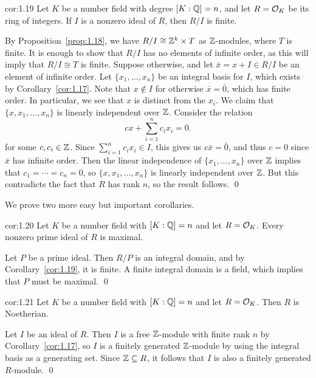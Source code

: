 \begin{cor}{cor:1.19}
    Let $K$ be a number field with degree $[K : \mathbb{Q}] = n$, and let 
    $R = {\cal O}_K$ be its ring of integers. 
    If $I$ is a nonzero ideal of $R$, then $R/I$ is finite. 
\end{cor}\vspace{-0.15cm}
\begin{pf}
    By Proposition~\ref{prop:1.18}, we have $R/I \cong \mathbb{Z}^k \times T$ 
    as $\mathbb{Z}$-modules, where $T$ is finite. It is enough to show that 
    $R/I$ has no elements of infinite order, as this will imply that 
    $R/I \cong T$ is finite. Suppose otherwise, and let $\bar{x} = 
    x + I \in R/I$ be an element of infinite order. Let $\{x_1, \dots, x_n\}$
    be an integral basis for $I$, which exists by Corollary~\ref{cor:1.17}. 
    Note that $x \notin I$ for otherwise $\bar{x} = \bar{0}$, which has 
    finite order. In particular, we see that $x$ is distinct from 
    the $x_i$. We claim that $\{x, x_1, \dots, x_n\}$ is linearly independent 
    over $\mathbb{Z}$. Consider the relation 
    \[ cx + \sum_{i=1}^n c_i x_i = 0. \] 
    for some $c, c_i \in \mathbb{Z}$. Since $\sum_{i=1}^n c_i x_i \in I$, this gives 
    us $c\bar{x} = \bar{0}$, and thus $c = 0$ since $\bar{x}$ has infinite 
    order. Then the linear independence of $\{x_1, \dots, x_n\}$ over $\mathbb{Z}$ 
    implies that $c_1 = \cdots = c_n = 0$, so $\{x, x_1, \dots, x_n\}$ 
    is linearly independent over $\mathbb{Z}$. But this contradicts the fact that $R$ 
    has rank $n$, so the result follows. \qed
\end{pf}\vspace{-0.25cm}

We prove two more easy but important corollaries. 

\begin{cor}{cor:1.20}
    Let $K$ be a number field with $[K : \mathbb{Q}] = n$ and let $R = {\cal O}_K$. 
    Every nonzero prime ideal of $R$ is maximal.
\end{cor}\vspace{-0.15cm}
\begin{pf}
    Let $P$ be a prime ideal. Then $R/P$ is an integral domain, and by 
    Corollary~\ref{cor:1.19}, it is finite. A finite integral 
    domain is a field, which implies that $P$ must be maximal. \qed
\end{pf}

\begin{cor}{cor:1.21}
    Let $K$ be a number field with $[K : \mathbb{Q}] = n$ and let $R = {\cal O}_K$. 
    Then $R$ is Noetherian. 
\end{cor}\vspace{-0.15cm}
\begin{pf}
    Let $I$ be an ideal of $R$. Then $I$ is a free $\mathbb{Z}$-module with 
    finite rank $n$ by Corollary~\ref{cor:1.17}, so $I$ is a finitely 
    generated $\mathbb{Z}$-module by using the integral basis as a generating set. 
    Since $\mathbb{Z} \subseteq R$, it follows that $I$ is also a finitely 
    generated $R$-module. \qed
\end{pf}